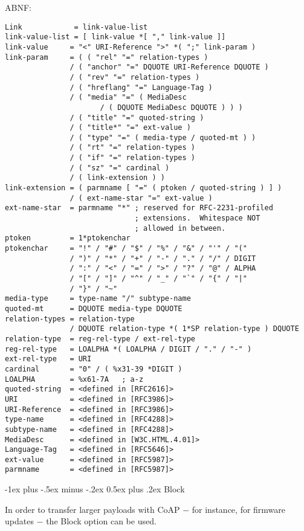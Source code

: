 \documentclass[10pt,landscape]{article}
\makeatletter
\renewcommand{\section}{\@startsection{section}{1}{0mm}%
                                {-1ex plus -.5ex minus -.2ex}%
                                {0.5ex plus .2ex}%
                                {\normalfont\large\bfseries}}
\makeatother
\begin{document}
\begin{multicols}{3}
ABNF:
{\tiny
\begin{verbatim}
Link            = link-value-list
link-value-list = [ link-value *[ "," link-value ]]
link-value     = "<" URI-Reference ">" *( ";" link-param )
link-param     = ( ( "rel" "=" relation-types )
               / ( "anchor" "=" DQUOTE URI-Reference DQUOTE )
               / ( "rev" "=" relation-types )
               / ( "hreflang" "=" Language-Tag )
               / ( "media" "=" ( MediaDesc
                      / ( DQUOTE MediaDesc DQUOTE ) ) )
               / ( "title" "=" quoted-string )
               / ( "title*" "=" ext-value )
               / ( "type" "=" ( media-type / quoted-mt ) )
               / ( "rt" "=" relation-types )
               / ( "if" "=" relation-types )
               / ( "sz" "=" cardinal )
               / ( link-extension ) )
link-extension = ( parmname [ "=" ( ptoken / quoted-string ) ] )
               / ( ext-name-star "=" ext-value )
ext-name-star  = parmname "*" ; reserved for RFC-2231-profiled
                              ; extensions.  Whitespace NOT
                              ; allowed in between.
ptoken         = 1*ptokenchar
ptokenchar     = "!" / "#" / "$" / "%" / "&" / "'" / "("
               / ")" / "*" / "+" / "-" / "." / "/" / DIGIT
               / ":" / "<" / "=" / ">" / "?" / "@" / ALPHA
               / "[" / "]" / "^" / "_" / "`" / "{" / "|"
               / "}" / "~"
media-type     = type-name "/" subtype-name
quoted-mt      = DQUOTE media-type DQUOTE
relation-types = relation-type
               / DQUOTE relation-type *( 1*SP relation-type ) DQUOTE
relation-type  = reg-rel-type / ext-rel-type
reg-rel-type   = LOALPHA *( LOALPHA / DIGIT / "." / "-" )
ext-rel-type   = URI
cardinal       = "0" / ( %x31-39 *DIGIT )
LOALPHA        = %x61-7A   ; a-z
quoted-string  = <defined in [RFC2616]>
URI            = <defined in [RFC3986]>
URI-Reference  = <defined in [RFC3986]>
type-name      = <defined in [RFC4288]>
subtype-name   = <defined in [RFC4288]>
MediaDesc      = <defined in [W3C.HTML.4.01]>
Language-Tag   = <defined in [RFC5646]>
ext-value      = <defined in [RFC5987]>
parmname       = <defined in [RFC5987]>
\end{verbatim}
}

\section{Block}

In order to transfer larger payloads with CoAP $-$ for instance, for
firmware updates $-$ the Block option can be used.


\end{multicols}
\end{document}
